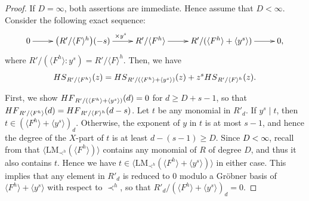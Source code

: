 \documentclass{article}
\theoremstyle{definition}
\theoremstyle{plain}
\theoremstyle{plain}
\theoremstyle{plain}
\theoremstyle{plain}
\numberwithin{equation}{subsection}
\begin{document}
\begin{proof}
If $D=\infty$, both assertions are immediate.
Hence assume that $D<\infty$.
Consider the following exact sequence:
\[{\xymatrix{
0 \ar[r] & 
\bigl(R'/\langle F\rangle^h\bigr)(-s)\ar[r]^(0.5){\quad \times y^{s}} &
R'/\langle F^h\rangle \ar[r] & 
R'/(\langle F^h\rangle+\langle y^{s}\rangle) \ar[r] & 
0, }}
\]
where $R'/(\langle F^h\rangle: y^{s})=R'/\langle F\rangle^h$. 
Then, we have 
\[
{\rm HS}_{R'/\langle F^h\rangle}(z)=
{\rm HS}_{R'/(\langle F^h\rangle +\langle y^{s}\rangle)}(z)+z^{s}{\rm HS}_{R'/\langle F\rangle^h}(z).
\]

First, we show ${\rm HF}_{R'/(\langle F^h\rangle +\langle y^{s}\rangle)}(d)=0$ for $d\geq D+s-1$, so that ${\rm HF}_{R'/\langle F^h\rangle}(d)={\rm HF}_{R'/\langle F\rangle^h}(d-s)$.
Let $t$ be any monomial in $R'_d$.
If $y^s \mid t$, then $t\in (\langle F^h \rangle + \langle y^s \rangle)_d$.
Otherwise, the exponent of $y$ in $t$ is at most $s-1$, and hence the degree of the $X$-part of $t$ is at least $d-(s-1)\geq D$.
Since \textcolor{black}{$D<\infty$}, recall from \cite[Lemma 3]{KY} that $\langle \mathrm{LM}_{\prec^h}(\langle F^h\rangle)\rangle$ contains any monomial of $R$ of degree $D$, and thus it also contains $t$.
Hence we have $t \in \langle \mathrm{LM}_{\prec^h}(\langle F^h\rangle +\langle y^{s}\rangle)\rangle$ in either case.
This implies that any element in $R'_d$ is reduced to $0$ modulo a Gr\"{o}bner basis of $\langle F^h \rangle + \langle y^s \rangle$ with respect to $\prec^h$, so that $R'_d/(\langle F^h\rangle +\langle y^{s}\rangle)_d = 0$.


\end{proof}
\end{document}
